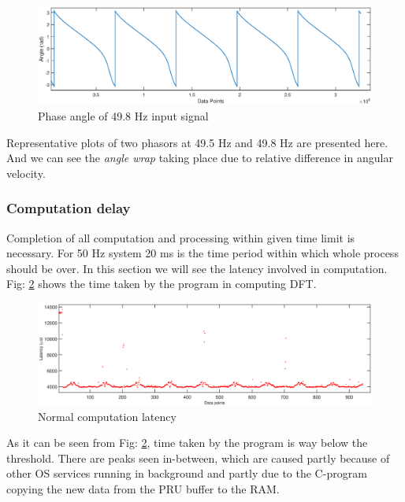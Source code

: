\begin{figure}[h]
	\includegraphics[width=\textwidth]{fig/498Hz_ang.eps}
	\caption{Phase angle of 49.8 Hz input signal}
	\label{fig:49.8Hz ang}
\end{figure}
 
Representative plots of two phasors at 49.5 Hz and 49.8 Hz are presented here. And we can see the \emph{angle wrap} taking place due to relative difference in angular velocity.

\subsubsection{Computation delay}
Completion of all computation and processing within given time limit is necessary. For 50 Hz system 20 ms is the time period within which whole process should be over. In this section we will see the latency involved in computation. Fig: \ref{fig:simpleLatency} shows the time taken by the program in computing DFT.

\begin{figure}[h]
	\includegraphics[width=\textwidth]{fig/simple_latency.eps}
	\caption{Normal computation latency}
	\label{fig:simpleLatency}
\end{figure}

As it can be seen from Fig: \ref{fig:simpleLatency}, time taken by the program is way below the threshold. There are peaks seen in-between, which are caused partly because of other OS services running in background and partly due to the C-program copying the new data from the PRU buffer to the RAM.   

